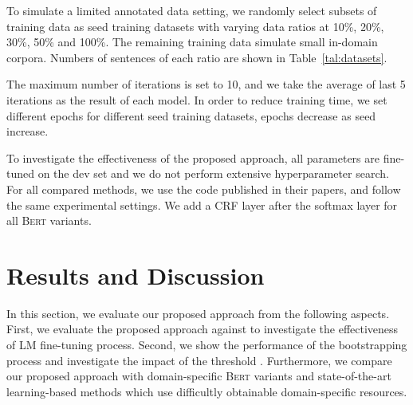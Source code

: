 \documentclass[10pt, conference, compsocconf]{IEEEtran}
\newcommand{\bert}{\textsc{Bert}\xspace}
\newcommand{\bertbase}{\xspace}
\begin{document}
To simulate a limited annotated data setting,
we randomly select subsets of training data as seed training datasets with varying data 
ratios at 10\%, 20\%, 30\%, 50\% and 100\%. The remaining training data simulate small in-domain corpora.
Numbers of sentences of each ratio are shown in Table~\ref{tal:datasets}.

The maximum number of iterations is set to 10, and we take the average of last 
5 iterations as the result of each model.
In order to reduce training time, we set different epochs for different seed training datasets, 
epochs decrease as seed increase.  

To investigate the effectiveness of the proposed approach, 
all parameters are fine-tuned on the dev set and we do not perform extensive hyperparameter search. 
For all compared methods, we use the code published in their papers, and follow the same experimental settings.
We add a CRF layer after the softmax layer for all \bert variants.


\section{Results and Discussion}
In this section, we evaluate our proposed approach from the following aspects.
First, we evaluate the proposed approach against \bertbase to investigate the effectiveness of LM fine-tuning process.
Second, we show the performance of the bootstrapping process and investigate the impact of the threshold . 
Furthermore, we compare our proposed approach with domain-specific \bert variants and  state-of-the-art 
learning-based methods which use difficultly obtainable domain-specific resources.
\end{document}
